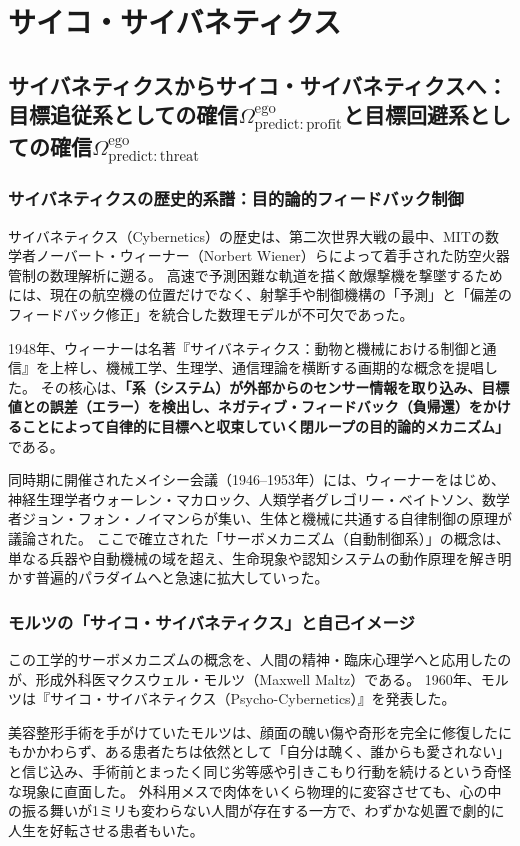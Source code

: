 \chapter{サイコ・サイバネティクス}
\section{サイバネティクスからサイコ・サイバネティクスへ：目標追従系としての確信$\Omega^{\mathrm{ego}}_{\mathrm{predict:profit}}$と目標回避系としての確信$\Omega^{\mathrm{ego}}_{\mathrm{predict:threat}}$}

\subsection{サイバネティクスの歴史的系譜：目的論的フィードバック制御}
サイバネティクス（Cybernetics）の歴史は、第二次世界大戦の最中、MITの数学者ノーバート・ウィーナー（Norbert Wiener）らによって着手された防空火器管制の数理解析に遡る。
高速で予測困難な軌道を描く敵爆撃機を撃墜するためには、現在の航空機の位置だけでなく、射撃手や制御機構の「予測」と「偏差のフィードバック修正」を統合した数理モデルが不可欠であった。

1948年、ウィーナーは名著『サイバネティクス：動物と機械における制御と通信』を上梓し、機械工学、生理学、通信理論を横断する画期的な概念を提唱した。
その核心は、\textbf{「系（システム）が外部からのセンサー情報を取り込み、目標値との誤差（エラー）を検出し、ネガティブ・フィードバック（負帰還）をかけることによって自律的に目標へと収束していく閉ループの目的論的メカニズム」}である。

同時期に開催されたメイシー会議（1946–1953年）には、ウィーナーをはじめ、神経生理学者ウォーレン・マカロック、人類学者グレゴリー・ベイトソン、数学者ジョン・フォン・ノイマンらが集い、生体と機械に共通する自律制御の原理が議論された。
ここで確立された「サーボメカニズム（自動制御系）」の概念は、単なる兵器や自動機械の域を超え、生命現象や認知システムの動作原理を解き明かす普遍的パラダイムへと急速に拡大していった。

\subsection{モルツの「サイコ・サイバネティクス」と自己イメージ}
この工学的サーボメカニズムの概念を、人間の精神・臨床心理学へと応用したのが、形成外科医マクスウェル・モルツ（Maxwell Maltz）である。
1960年、モルツは『サイコ・サイバネティクス（Psycho-Cybernetics）』を発表した。

美容整形手術を手がけていたモルツは、顔面の醜い傷や奇形を完全に修復したにもかかわらず、ある患者たちは依然として「自分は醜く、誰からも愛されない」と信じ込み、手術前とまったく同じ劣等感や引きこもり行動を続けるという奇怪な現象に直面した。
外科用メスで肉体をいくら物理的に変容させても、心の中の振る舞いが1ミリも変わらない人間が存在する一方で、わずかな処置で劇的に人生を好転させる患者もいた。

